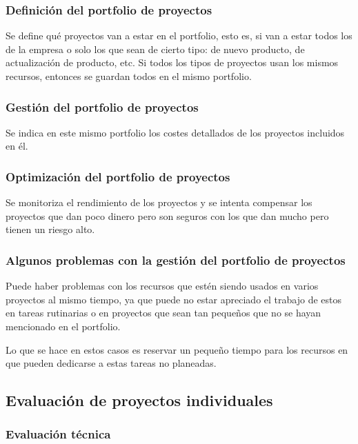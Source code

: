 \documentclass[12pt]{article}
\begin{document}
\subsubsection{Definición del portfolio de proyectos}
\label{2.3.1}

{Se define qué proyectos van a estar en el portfolio, esto es, si van a estar todos los de la empresa o solo los que sean de cierto tipo: de nuevo producto, de actualización de producto, etc. Si todos los tipos de proyectos usan los mismos recursos, entonces se guardan todos en el mismo portfolio.}

\subsubsection{Gestión del portfolio de proyectos}
\label{2.3.2}

{Se indica en este mismo portfolio los costes detallados de los proyectos incluidos en él.}

\subsubsection{Optimización del portfolio de proyectos}
\label{2.3.3}

{Se monitoriza el rendimiento de los proyectos y se intenta compensar los proyectos que dan poco dinero pero son seguros con los que dan mucho pero tienen un riesgo alto.}

\subsubsection{Algunos problemas con la gestión del portfolio de proyectos}
\label{2.3.4}

{Puede haber problemas con los recursos que estén siendo usados en varios proyectos al mismo tiempo, ya que puede no estar apreciado el trabajo de estos en tareas rutinarias o en proyectos que sean tan pequeños que no se hayan mencionado en el portfolio.} \bigskip

{Lo que se hace en estos casos es reservar un pequeño tiempo para los recursos en que pueden dedicarse a estas tareas no planeadas.}

\subsection{Evaluación de proyectos individuales}
\label{2.4.0}
\subsubsection{Evaluación técnica}
\label{2.4.1}
\end{document}
